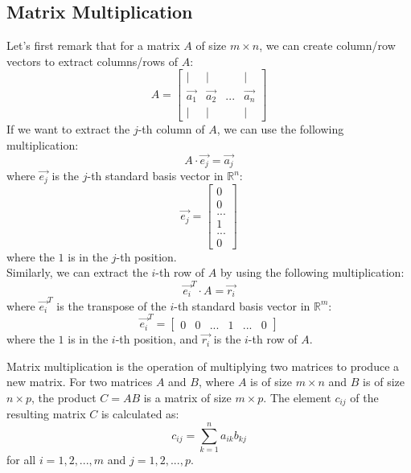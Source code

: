 \subsection{Matrix Multiplication}
Let's first remark that for a matrix $A$ of size $m \times n$, we can create column/row vectors to extract columns/rows of $A$:
\[
    A = 
    \begin{bmatrix}
        | & | &        & | \\
        \vec{a_1} & \vec{a_2} & ... & \vec{a_n} \\
        | & | &        & |
    \end{bmatrix}
\]
If we want to extract the $j$-th column of $A$, we can use the following multiplication:
\[
    A \cdot \vec{e_j} = \vec{a_j}
\]
where $\vec{e_j}$ is the $j$-th standard basis vector in $\mathbb{R}^n$:
\[
    \vec{e_j} = 
    \begin{bmatrix}
        0 \\
        0 \\
        ... \\
        1 \\
        ... \\
        0
    \end{bmatrix}
\]
where the $1$ is in the $j$-th position. \\
Similarly, we can extract the $i$-th row of $A$ by using the following multiplication:
\[
    \vec{e_i}^T \cdot A = \vec{r_i}
\]
where $\vec{e_i}^T$ is the transpose of the $i$-th standard basis vector in $\mathbb{R}^m$:
\[
    \vec{e_i}^T = 
    \begin{bmatrix}
        0 & 0 & ... & 1 & ... & 0
    \end{bmatrix}
\]
where the $1$ is in the $i$-th position, and $\vec{r_i}$ is the $i$-th row of $A$.
\begin{definition}
    Matrix multiplication is the operation of multiplying two matrices to produce a new matrix. For two matrices \( A \) and \( B \), where \( A \) is of size \( m \times n \) and \( B \) is of size \( n \times p \), the product \( C = AB \) is a matrix of size \( m \times p \). The element \( c_{ij} \) of the resulting matrix \( C \) is calculated as:
    \[
        c_{ij} = \sum_{k=1}^{n} a_{ik} b_{kj}
    \]
    for all \( i = 1, 2, ..., m \) and \( j = 1, 2, ..., p \).
\end{definition}
